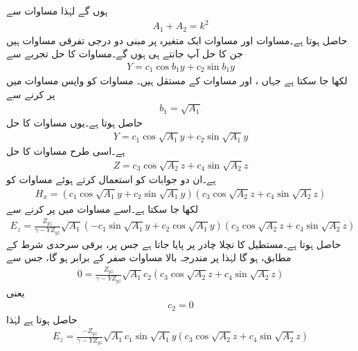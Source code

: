 ہوں گے لہٰذا مساوات  سے
\begin{align}\label{مساوات_مویج_مختلف_مستقل_تعلق}
A_1+A_2=k^2
\end{align}
حاصل ہوتا ہے۔مساوات  اور مساوات  ایک متغیرہ پر مبنی دو درجی تفرقی مساوات ہیں جن کا حل آپ جانتے ہی ہوں گے۔مساوات  کا حل تجربے سے
\begin{align}\label{مساوات_مویج_موج_حل_الف}
Y=c_1 \cos b_1 y + c_2 \sin b_1 y
\end{align}
لکھا جا سکتا ہے جہاں ،  اور  مساوات کے مستقل ہیں۔ مساوات  کو واپس مساوات  میں پر کرنے سے
\begin{align*}
b_1=\sqrt{A_1}
\end{align*}
حاصل ہوتا ہے۔یوں  مساوات  کا حل
\begin{align}\label{مساوات_مویج_موج_حل_ب}
Y=c_1 \cos \sqrt{A_1} y + c_2 \sin \sqrt{A_1} y
\end{align}
ہے۔اسی طرح مساوات  کا حل
\begin{align}\label{مساوات_مویج_موج_حل_پ}
Z=c_3 \cos \sqrt{A_2} z + c_4 \sin \sqrt{A_2} z
\end{align}
ہے۔ان دو جوابات کو استعمال کرتے ہوئے مساوات  کو
\begin{align}\label{مساوات_مویج_موج_حل_ت}
H_x=\left(c_1 \cos \sqrt{A_1} y + c_2 \sin \sqrt{A_1} y\right) \left(c_3 \cos \sqrt{A_2} z + c_4 \sin \sqrt{A_2} z\right)
\end{align}
لکھا جا سکتا ہے۔اسے مساوات  میں پر کرنے سے
\begin{align*}
E_z=\frac{Z_{yz}}{\gamma-Y Z_{yz}} \sqrt{A_1}\left(-c_1 \sin \sqrt{A_1} y + c_2 \cos \sqrt{A_1} y\right) \left(c_3 \cos \sqrt{A_2} z + c_4 \sin \sqrt{A_2} z\right)
\end{align*}
حاصل ہوتا ہے۔مستطیل کا نچلا چادر  پر پایا جاتا ہے جس پر، برقی سرحدی شرط کے مطابق،  ہو گا لہٰذا  پر مندرجہ بالا مساوات صفر کے برابر ہو گا، جس سے
 \begin{align*}
0=\frac{Z_{yz}}{\gamma-Y Z_{yz}} \sqrt{A_1} c_2  \left(c_3 \cos \sqrt{A_2} z + c_4 \sin \sqrt{A_2} z\right)
\end{align*}
یعنی
\begin{align}
c_2=0
\end{align}
حاصل ہوتا ہے لہٰذا
\begin{align*}
E_z=\frac{-Z_{yz}}{\gamma-Y Z_{yz}} \sqrt{A_1}c_1 \sin \sqrt{A_1} y \left(c_3 \cos \sqrt{A_2} z + c_4 \sin \sqrt{A_2} z\right)
\end{align*}
